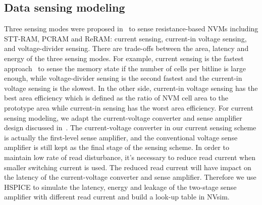 \subsection{Data sensing modeling}
Three sensing modes were proposed in~\cite{CACTI:DATE11:Xu} to sense resistance-based NVMs including STT-RAM, PCRAM and ReRAM: current sensing, current-in voltage sensing, and voltage-divider sensing. There are trade-offs between the area, latency and energy of the three sensing modes. For example, current sensing is the fastest approach~\cite{RRAM:ITRI11} to sense the memory state if the number of cells per bitline is large enough, while voltage-divider sensing is the second fastest and the current-in voltage sensing is the slowest. In the other side, current-in voltage sensing has the best area efficiency which is defined as the ratio of NVM cell area to the prototype area while current-in sensing has the worst area efficiency. For current sensing modeling, we adapt the current-voltage converter and sense amplifier design discussed in~\cite{CACTI:DAC08:Dong}. The current-voltage converter in our current sensing scheme is actually the first-level sense amplifier, and the conventional voltage sense amplifier is still kept as the final stage of the sensing scheme. In order to maintain low rate of read disturbance, it's necessary to reduce read current when smaller switching current is used. The reduced read current will have impact on the latency of the current-voltage converter and sense amplifier. Therefore we use HSPICE to simulate the latency, energy and leakage of the two-stage sense amplifier with different read current and build a look-up table in NVsim.

